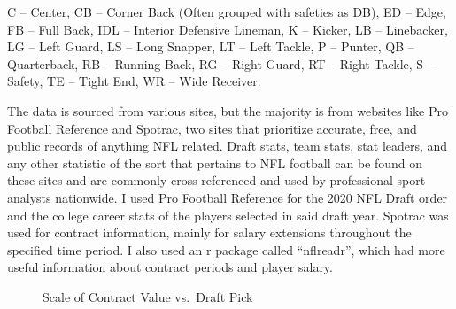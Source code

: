 \documentclass[
  letterpaper,
  DIV=11,
  numbers=noendperiod]{scrartcl}
\begin{document}
C -- Center, CB -- Corner Back (Often grouped with safeties as DB), ED
-- Edge, FB -- Full Back, IDL -- Interior Defensive Lineman, K --
Kicker, LB -- Linebacker, LG -- Left Guard, LS -- Long Snapper, LT --
Left Tackle, P -- Punter, QB -- Quarterback, RB -- Running Back, RG --
Right Guard, RT -- Right Tackle, S -- Safety, TE -- Tight End, WR --
Wide Receiver.

The data is sourced from various sites, but the majority is from
websites like Pro Football Reference and Spotrac, two sites that
prioritize accurate, free, and public records of anything NFL related.
Draft stats, team stats, stat leaders, and any other statistic of the
sort that pertains to NFL football can be found on these sites and are
commonly cross referenced and used by professional sport analysts
nationwide. I used Pro Football Reference for the 2020 NFL Draft order
and the college career stats of the players selected in said draft year.
Spotrac was used for contract information, mainly for salary extensions
throughout the specified time period. I also used an r package called
``nflreadr'', which had more useful information about contract periods
and player salary.

\begin{figure}[H]


\caption{\label{fig-contract_signing_scale}Scale of Contract Value
vs.~Draft Pick}

\end{figure}%
\end{document}
